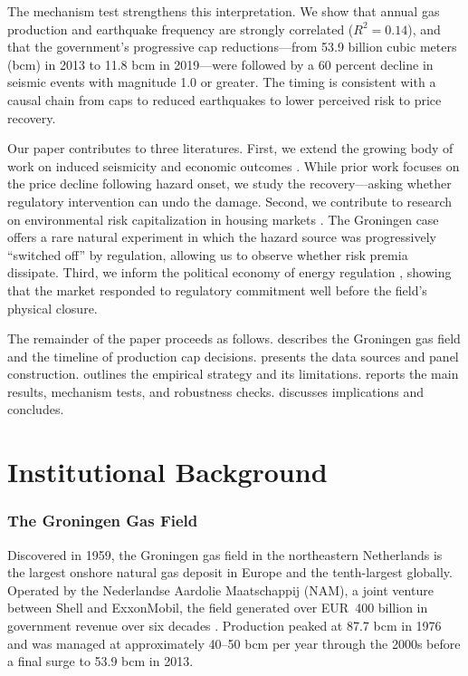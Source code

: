 \documentclass[12pt]{article}
\begin{document}
The mechanism test strengthens this interpretation. We show that annual gas production and earthquake frequency are strongly correlated ($R^2 = 0.14$), and that the government's progressive cap reductions---from 53.9 billion cubic meters (bcm) in 2013 to 11.8 bcm in 2019---were followed by a 60 percent decline in seismic events with magnitude 1.0 or greater. The timing is consistent with a causal chain from caps to reduced earthquakes to lower perceived risk to price recovery.

Our paper contributes to three literatures. First, we extend the growing body of work on induced seismicity and economic outcomes \citep{bosker2019, muehlenbachs2015, gibbons2015}. While prior work focuses on the price decline following hazard onset, we study the recovery---asking whether regulatory intervention can undo the damage. Second, we contribute to research on environmental risk capitalization in housing markets \citep{davis2004, chay2005, greenstone2009}. The Groningen case offers a rare natural experiment in which the hazard source was progressively ``switched off'' by regulation, allowing us to observe whether risk premia dissipate. Third, we inform the political economy of energy regulation \citep{kahn2015, Aldy2014}, showing that the market responded to regulatory commitment well before the field's physical closure.

The remainder of the paper proceeds as follows.  describes the Groningen gas field and the timeline of production cap decisions.  presents the data sources and panel construction.  outlines the empirical strategy and its limitations.  reports the main results, mechanism tests, and robustness checks.  discusses implications and concludes.

\section{Institutional Background}\label{sec:background}

\subsubsection*{The Groningen Gas Field} Discovered in 1959, the Groningen gas field in the northeastern Netherlands is the largest onshore natural gas deposit in Europe and the tenth-largest globally. Operated by the Nederlandse Aardolie Maatschappij (NAM), a joint venture between Shell and ExxonMobil, the field generated over EUR~400 billion in government revenue over six decades \citep{correljmpe2009}. Production peaked at 87.7 bcm in 1976 and was managed at approximately 40--50 bcm per year through the 2000s before a final surge to 53.9 bcm in 2013.
\end{document}
